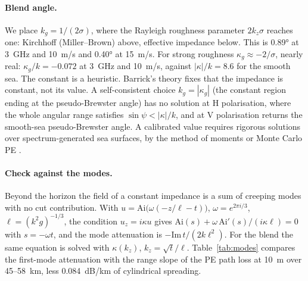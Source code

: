 \documentclass[11pt,a4paper]{article}
\newcommand{\kz}{k_z}
\begin{document}
\paragraph{Blend angle.}
We place $k_g=1/(2\sigma)$, where the Rayleigh roughness parameter $2\kz\sigma$
reaches one: Kirchhoff (Miller--Brown) above, effective impedance below. This is
\ang{0.89} at \SI{3}{GHz} and \SI{10}{m/s} and \ang{0.40} at \SI{15}{m/s}. For strong
roughness $\kappa_g\approx-2/\sigma$, nearly real: $\kappa_g/k=-0.072$ at
\SI{3}{GHz} and \SI{10}{m/s}, against $|\kappa|/k=8.6$ for the smooth sea. The constant
is a heuristic. Barrick's theory fixes that the impedance is constant, not its value.
A self-consistent choice $k_g=|\kappa_g|$ (the constant region ending at the
pseudo-Brewster angle) has no solution at H polarisation, where the whole angular
range satisfies $\sin\psi<|\kappa|/k$, and at V polarisation returns the smooth-sea
pseudo-Brewster angle. A calibrated value requires rigorous solutions over
spectrum-generated sea surfaces, by the method of moments \cite{freund2006} or
Monte Carlo PE \cite{gao2019}.

\paragraph{Check against the modes.}
Beyond the horizon the field of a constant impedance is a sum of creeping modes
with no cut contribution. With $u=\mathrm{Ai}\bigl(\omega(-z/\ell-t)\bigr)$,
$\omega=e^{2\pi i/3}$, $\ell=(k^2g)^{-1/3}$, the condition $u_z=i\kappa u$ gives
$\mathrm{Ai}(s)+\omega\,\mathrm{Ai}'(s)/(i\kappa\ell)=0$ with $s=-\omega t$, and the mode
attenuation is $-\mathrm{Im}\,t/(2k\ell^2)$. For the blend the same equation is solved
with $\kappa(\kz)$, $\kz=\sqrt t/\ell$. Table~\ref{tab:modes} compares the first-mode
attenuation with the range slope of the PE path loss at \SI{10}{m} over
45--\SI{58}{km}, less \SI{0.084}{dB/km} of cylindrical spreading.
\end{document}
